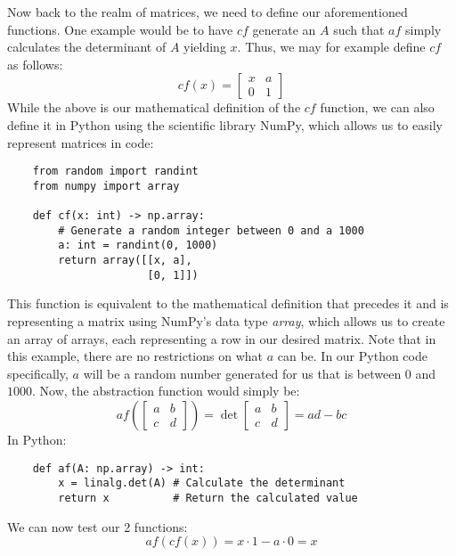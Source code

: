 Now back to the realm of matrices, we need to define our aforementioned
functions. One example would be to have $ cf $ generate an $ A $ such that $ af
$ simply calculates the determinant of $ A $ yielding $ x $. Thus, we may for
example define $ cf $ as follows:
\begin{equation*}
    cf(x)
    =
    \begin{bmatrix}
        x & a \\
        0 & 1
    \end{bmatrix}
\end{equation*}
While the above is our mathematical definition of the $ cf $ function, we can
also define it in Python using the scientific library NumPy, which allows us to
easily represent matrices in code:
\begin{verbatim}
    from random import randint
    from numpy import array

    def cf(x: int) -> np.array:
        # Generate a random integer between 0 and a 1000
        a: int = randint(0, 1000)
        return array([[x, a],
                      [0, 1]])
\end{verbatim}
This function is equivalent to the mathematical definition that precedes it and
is representing a matrix using NumPy's data type \textit{array}, which allows
us to
create an array of arrays, each representing a row in our desired matrix. Note
that in this example, there are no restrictions on what $ a $ can be. In our
Python code specifically, $ a $ will be a random number generated for us that
is between $ 0
$ and $ 1000 $. Now, the abstraction
function would simply be:
\begin{equation*}
    af \left(
    \begin{bmatrix}
        a & b \\
        c & d
    \end{bmatrix}
    \right)
    =
    \det
    \begin{bmatrix}
        a & b \\
        c & d
    \end{bmatrix}
    = ad - bc
\end{equation*}
In Python:
\begin{verbatim}
    def af(A: np.array) -> int:
        x = linalg.det(A) # Calculate the determinant
        return x          # Return the calculated value
\end{verbatim}
We can now test our 2 functions:
\begin{equation*}
    af(cf(x)) = x \cdot 1- a \cdot 0 = x
\end{equation*}
